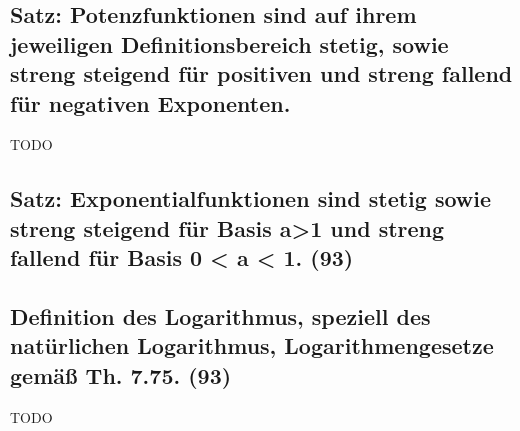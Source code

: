 \subsection{Satz: Potenzfunktionen sind auf ihrem jeweiligen Definitionsbereich stetig, sowie streng steigend für positiven und streng fallend für negativen Exponenten.}

TODO

\subsection{Satz: Exponentialfunktionen sind stetig sowie streng steigend für Basis a>1 und streng fallend für Basis 0 < a < 1. (93)}

\subsection{Definition des Logarithmus, speziell des natürlichen Logarithmus, Logarithmengesetze gemäß Th. 7.75. (93)}

TODO
